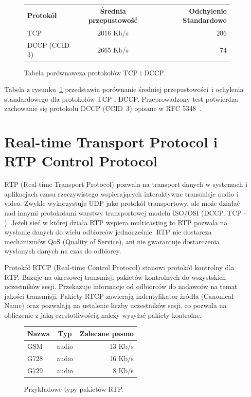 \begin{figure}[h!]
	\centering
	\begin{tabular}{ l | c | r }
  		Protokół & Średnia przepustowość & Odchylenie Standardowe \\
  		\hline
  		TCP & 2016 Kb/s & 206 \\
  		DCCP (CCID 3) & 2665 Kb/s & 74 \\
	\end{tabular}
	\caption{Tabela porównawcza protokołów TCP i DCCP.}
	\label{TCP_DCCP_table}
\end{figure}

Tabela z rysunku~\ref{TCP_DCCP_table} przedstawia porównanie średniej przepustowości~i ochylenia standardowego dla protokołów TCP i DCCP. Przeprowadzony test potwierdza zachowanie się protokołu DCCP (CCID~3) opisane w RFC 5348~\cite{RFC5348}. 

\section{Real-time Transport Protocol i RTP Control Protocol}

RTP (Real-time Transport Protocol) pozwala na transport danych w systemach i aplikacjach czasu rzeczywistego wspierających interaktywne transmisje audio i video. Zwykle wykorzystuje UDP jako protokół transportowy, ale może działać nad innymi protokołami warstwy transportowej modelu ISO/OSI (DCCP, TCP - \cite{RFC3550, RFC5762}). Jeżeli sieć w której działa RTP wspiera multicasting to RTP pozwala na wysłanie danych do wielu odbiorców jednocześnie. RTP nie dostarcza mechanizmów QoS (Quality of Service), ani nie gwarantuje dostarczenia wysłanych danych na czas do odbiorcy.

Protokół RTCP (Real-time Control Protocol) stanowi protokół kontrolny dla RTP. Bazuje na okresowej transmisji pakietów kontrolnych do wszystskich uczestników sesji. Przekazuje informacje od odbiorców do nadawców na temat jakości transmisji. Pakiety RTCP zawierają indentyfikator źródła (Canonical Name) oraz pozwalają na ustalenie liczby uczestników sesji, co pozwala na obliczenie z jaką częstotliwością należy wysyłać pakiety kontrolne.

\begin{figure}[h!]
	\centering
	\begin{tabular}{ l | c | r }
  		Nazwa & Typ & Zalecane pasmo \\
  		\hline
  		GSM & audio & 13 Kb/s \\
  		G728 & audio & 16 Kb/s  \\
  		G729 & audio & 8 Kb/s  \\
	\end{tabular}
	\caption{Przykładowe typy pakietów RTP.}
	\label{RTP_table}
\end{figure}

